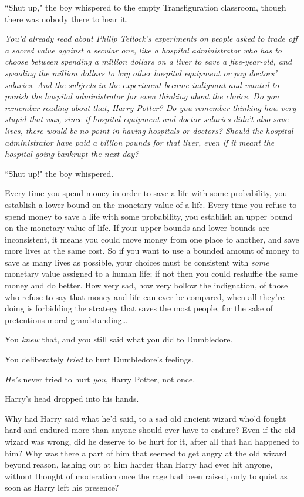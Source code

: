 ``Shut up," the boy whispered to the empty Transfiguration classroom, though there was nobody there to hear it.

\emph{You'd already read about Philip Tetlock's experiments on people asked to trade off a sacred value against a secular one, like a hospital administrator who has to choose between spending a million dollars on a liver to save a five-year-old, and spending the million dollars to buy other hospital equipment or pay doctors' salaries. And the subjects in the experiment became indignant and wanted to punish the hospital administrator for even thinking about the choice. Do you remember reading about that, Harry Potter? Do you remember thinking how very stupid that was, since if hospital equipment and doctor salaries didn't also save lives, there would be no point in having hospitals or doctors? Should the hospital administrator have paid a billion pounds for that liver, even if it meant the hospital going bankrupt the next day?}

``Shut up!" the boy whispered.

\begin{em}
Every time you spend money in order to save a life with some probability, you establish a lower bound on the monetary value of a life. Every time you refuse to spend money to save a life with some probability, you establish an upper bound on the monetary value of life. If your upper bounds and lower bounds are inconsistent, it means you could move money from one place to another, and save more lives at the same cost. So if you want to use a bounded amount of money to save as many lives as possible, your choices must be consistent with \emph{some} monetary value assigned to a human life; if not then you could reshuffle the same money and do better. How very sad, how very hollow the indignation, of those who refuse to say that money and life can ever be compared, when all they're doing is forbidding the strategy that saves the most people, for the sake of pretentious moral grandstanding{\ldots}

You \emph{knew} that, and you still said what you did to Dumbledore.

You deliberately \emph{tried} to hurt Dumbledore's feelings.

\emph{He's} never tried to hurt \emph{you}, Harry Potter, not once.
\end{em}

Harry's head dropped into his hands.

Why had Harry said what he'd said, to a sad old ancient wizard who'd fought hard and endured more than anyone should ever have to endure? Even if the old wizard was wrong, did he deserve to be hurt for it, after all that had happened to him? Why was there a part of him that seemed to get angry at the old wizard beyond reason, lashing out at him harder than Harry had ever hit anyone, without thought of moderation once the rage had been raised, only to quiet as soon as Harry left his presence?

